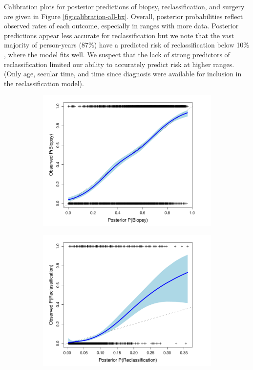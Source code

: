 \documentclass[12pt, letterpaper]{article}
\begin{document}
Calibration plots for posterior predictions of biopsy, reclassification, and surgery are given in Figure \ref{fig:calibration-all-bx}. Overall, posterior probabilities reflect observed rates of each outcome, especially in ranges with more data. Posterior predictions appear less accurate for reclassification but we note that the vast majority of person-years (87$\%$) have a predicted risk of reclassification below 10$\%$, where the model fits well. We suspect that the lack of strong predictors of reclassification limited our ability to accurately predict risk at higher ranges. (Only age, secular time, and time since diagnosis were available for inclusion in the reclassification model).

\begin{figure}
\begin{center}
\begin{subfigure}[b]{0.5\textwidth}
\includegraphics[width=\textwidth]{pred-vs-obs-bx.pdf}
\end{subfigure}
\begin{subfigure}[b]{0.5\textwidth}
\includegraphics[width=\textwidth]{pred-vs-obs-rc.pdf}

\end{subfigure}
\end{center}
\end{figure}
\end{document}
